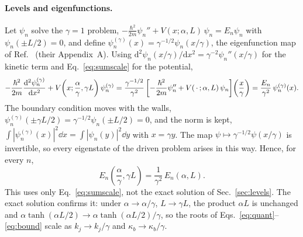 \documentclass[11pt]{article}
\numberwithin{equation}{section}
\begin{document}
\paragraph{Levels and eigenfunctions.} Let $\psi_n$ solve the $\gamma=1$ problem, $-\frac{\hbar^2}{2m}\psi_n''+V(x;\alpha,L)\,\psi_n=E_n\psi_n$ with $\psi_n(\pm L/2)=0$, and define $\psi_n^{(\gamma)}(x)=\gamma^{-1/2}\psi_n(x/\gamma)$, the eigenfunction map of Ref.~\cite{deffner2014} (their Appendix~A). Using $\mathrm{d}^2\psi_n(x/\gamma)/\mathrm{d}x^2=\gamma^{-2}\psi_n''(x/\gamma)$ for the kinetic term and Eq.~\eqref{eq:sumscale} for the potential,
\[
-\frac{\hbar^2}{2m}\dv[2]{\psi_n^{(\gamma)}}{x}+V\!\left(x;\frac\alpha\gamma,\gamma L\right)\psi_n^{(\gamma)}
=\frac{\gamma^{-1/2}}{\gamma^2}\left[-\frac{\hbar^2}{2m}\psi_n''+V(\,\cdot\,;\alpha,L)\,\psi_n\right]\!\left(\frac x\gamma\right)=\frac{E_n}{\gamma^2}\,\psi_n^{(\gamma)}(x).
\]
The boundary condition moves with the walls, $\psi_n^{(\gamma)}(\pm\gamma L/2)=\gamma^{-1/2}\psi_n(\pm L/2)=0$, and the norm is kept, $\int|\psi_n^{(\gamma)}(x)|^2\dd x=\int|\psi_n(y)|^2\dd y$ with $x=\gamma y$. The map $\psi\mapsto\gamma^{-1/2}\psi(x/\gamma)$ is invertible, so every eigenstate of the driven problem arises in this way. Hence, for every $n$,
\begin{equation}
E_n\!\left(\frac\alpha\gamma,\gamma L\right)=\frac{1}{\gamma^2}\,E_n(\alpha,L).
\label{eq:Escale}
\end{equation}
This uses only Eq.~\eqref{eq:sumscale}, not the exact solution of Sec.~\ref{sec:levels}. The exact solution confirms it: under $\alpha\to\alpha/\gamma$, $L\to\gamma L$, the product $\alpha L$ is unchanged and $\alpha\tanh(\alpha L/2)\to\alpha\tanh(\alpha L/2)/\gamma$, so the roots of Eqs.~\eqref{eq:quant}--\eqref{eq:bound} scale as $k_j\to k_j/\gamma$ and $\kappa_b\to\kappa_b/\gamma$.
\end{document}
